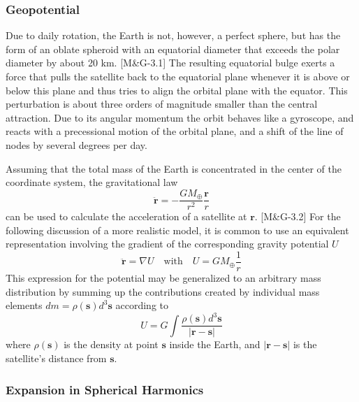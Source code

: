 \documentclass[11pt]{article}
\begin{document}
\subsubsection{Geopotential}

Due to daily rotation, the Earth is not, however, a perfect
sphere, but has the form of an oblate spheroid with an equatorial
diameter that exceeds the polar diameter by about 20 km. [M\&G-3.1] The resulting
equatorial bulge exerts a force that pulls the satellite back to the
equatorial plane whenever it is above or below this plane and thus
tries to align the orbital plane with the equator. This perturbation
is about three orders of magnitude smaller than the central
attraction. Due to its angular momentum the orbit behaves like a
gyroscope, and reacts with a precessional motion of the orbital plane,
and a shift of the line of nodes by several degrees per day.

Assuming that the total mass of the Earth is concentrated
in the center of the coordinate system, the gravitational law
\begin{equation}
  \ddot{\boldsymbol{r}} = -\frac{GM_{\oplus}}{r^2}\frac{\boldsymbol{r}}{r} \label{2.1}\tag{2.1}
\end{equation}
can be used to calculate the acceleration of a satellite at
$\boldsymbol{r}$. [M\&G-3.2] For the following discussion of a more realistic
model, it is common to use an equivalent representation involving the
gradient of the corresponding gravity potential $U$
\begin{equation}
  \ddot{\boldsymbol{r}} = \nabla U \quad \text{with} \quad U
  = GM_{\oplus}\frac{1}{r} \label{3.3}\tag{3.3}
\end{equation}
This expression for the potential may be generalized to an arbitrary
mass distribution by summing up the contributions created by
individual mass elements $dm = \rho(\boldsymbol{s})d^3\boldsymbol{s}$
according to
\begin{equation}
  U = G \int
  \frac{\rho(\boldsymbol{s})d^3\boldsymbol{s}}
       {|\boldsymbol{r} - \boldsymbol{s}|} \label{3.4}\tag{3.4}
\end{equation}
where $\rho(\boldsymbol{s})$ is the density at point $\boldsymbol{s}$
inside the Earth, and $|\boldsymbol{r} - \boldsymbol{s}|$ is the
satellite's distance from $\boldsymbol{s}$.

\subsubsection{Expansion in Spherical Harmonics}
\end{document}
